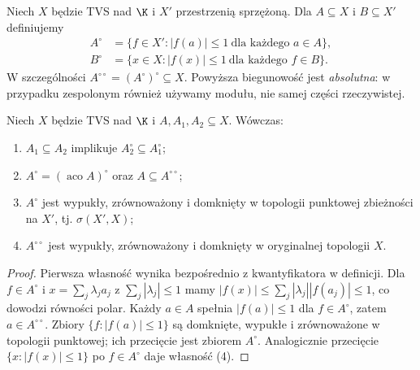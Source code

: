 \begin{definicja}\label{def:polar}
Niech $X$ będzie TVS nad $\K$ i $X'$ przestrzenią sprzężoną.
Dla $A\subseteq X$ i $B\subseteq X'$ definiujemy
\[
 \begin{aligned}
 A^\circ&=\{f\in X':|f(a)|\le1\ \text{dla każdego }a\in A\},\\
 B^\circ&=\{x\in X:|f(x)|\le1\ \text{dla każdego }f\in B\}.
 \end{aligned}
\]
W szczególności $A^{\circ\circ}=(A^\circ)^\circ\subseteq X$.
Powyższa biegunowość jest \emph{absolutna}: w przypadku
zespolonym również używamy modułu, nie samej części rzeczywistej.
\end{definicja}

\begin{stwierdzenie}\label{prop:polar-properties}
Niech $X$ będzie TVS nad $\K$ i $A,A_1,A_2\subseteq X$.
Wówczas:
\begin{enumerate}
\item $A_1\subseteq A_2$ implikuje $A_2^\circ\subseteq A_1^\circ$;
\item $A^\circ=(\operatorname{aco}A)^\circ$ oraz
      $A\subseteq A^{\circ\circ}$;
\item $A^\circ$ jest wypukły, zrównoważony i domknięty
      w topologii punktowej zbieżności na $X'$, tj. $\sigma(X',X)$;
\item $A^{\circ\circ}$ jest wypukły, zrównoważony i domknięty
      w oryginalnej topologii $X$.
\end{enumerate}
\end{stwierdzenie}
\begin{proof}
Pierwsza własność wynika bezpośrednio z kwantyfikatora
w definicji. Dla $f\in A^\circ$ i
$x=\sum_j\lambda_j a_j$ z $\sum_j|\lambda_j|\le1$
mamy $|f(x)|\le\sum_j|\lambda_j||f(a_j)|\le1$,
co dowodzi równości polar. Każdy $a\in A$ spełnia
$|f(a)|\le1$ dla $f\in A^\circ$, zatem $a\in A^{\circ\circ}$.
Zbiory $\{f:|f(a)|\le1\}$ są domknięte, wypukłe i
zrównoważone w topologii punktowej; ich przecięcie
jest zbiorem $A^\circ$. Analogicznie przecięcie
$\{x:|f(x)|\le1\}$ po $f\in A^\circ$ daje własność (4).
\end{proof}

